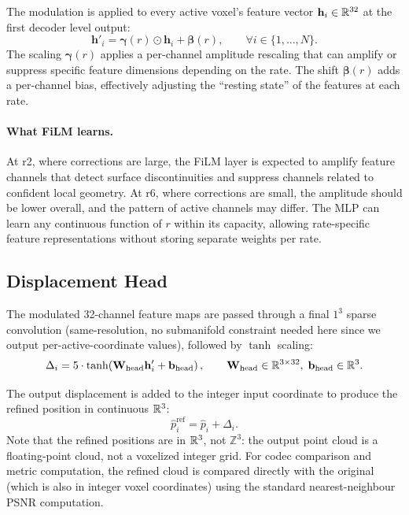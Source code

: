 The modulation is applied to every active voxel's feature vector $\mathbf{h}_i \in \mathbb{R}^{32}$
at the first decoder level output:
\begin{equation}
  \mathbf{h}'_i = \boldsymbol{\gamma}(r) \odot \mathbf{h}_i + \boldsymbol{\beta}(r),
  \qquad \forall i \in \{1, \ldots, N\}.
\end{equation}
The scaling $\boldsymbol{\gamma}(r)$ applies a per-channel amplitude rescaling
that can amplify or suppress specific feature dimensions depending on the rate.
The shift $\boldsymbol{\beta}(r)$ adds a per-channel bias, effectively
adjusting the ``resting state'' of the features at each rate.

\paragraph{What FiLM learns.}
At r2, where corrections are large, the FiLM layer is expected to amplify
feature channels that detect surface discontinuities and suppress channels
related to confident local geometry.
At r6, where corrections are small, the amplitude should be lower overall,
and the pattern of active channels may differ.
The MLP can learn any continuous function of $r$ within its capacity,
allowing rate-specific feature representations without storing separate weights
per rate.

\subsection{Displacement Head}

The modulated 32-channel feature maps are passed through a final $1^3$ sparse
convolution (same-resolution, no submanifold constraint needed here since we
output per-active-coordinate values), followed by $\tanh$ scaling:
\begin{equation}
  \Delta_i = 5 \cdot \tanh\!\left(\mathbf{W}_{\text{head}} \mathbf{h}'_i + \mathbf{b}_{\text{head}}\right),
  \qquad \mathbf{W}_{\text{head}} \in \mathbb{R}^{3 \times 32},\; \mathbf{b}_{\text{head}} \in \mathbb{R}^3.
\end{equation}

The output displacement is added to the integer input coordinate to
produce the refined position in continuous $\mathbb{R}^3$:
\begin{equation}
  \hat{p}^{\text{ref}}_i = \hat{p}_i + \Delta_i.
\end{equation}
Note that the refined positions are in $\mathbb{R}^3$, not $\mathbb{Z}^3$:
the output point cloud is a floating-point cloud, not a voxelized integer grid.
For codec comparison and metric computation, the refined cloud is compared
directly with the original (which is also in integer voxel coordinates)
using the standard nearest-neighbour PSNR computation.

